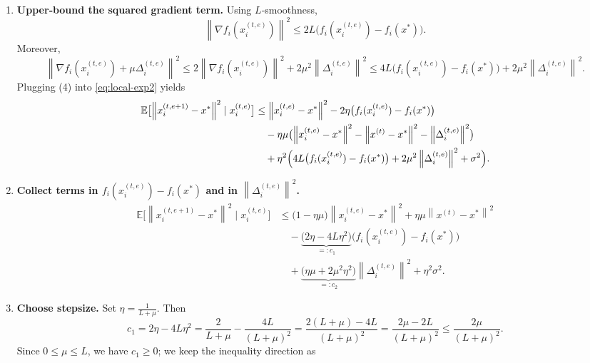 \documentclass{article}
\newcommand{\E}{\mathbb{E}}
\newcommand{\norm}[1]{\left\lVert#1\right\rVert}
\begin{document}
\begin{enumerate}
\begin{align}
&\quad -\eta\mu\Bigl(\norm{x_{i}^{(t,e)}-x^{*}}^{2}
-\norm{x^{(t)}-x^{*}}^{2}
-\norm{\Delta_{i}^{(t,e)}}^{2}\Bigr) \nonumber\\
&\quad+\eta^{2}\Bigl(\norm{\nabla f_i(x_{i}^{(t,e)})+\mu\Delta_{i}^{(t,e)}}^{2}+\sigma^{2}\Bigr).
\label{eq:local-exp2}
\end{align}
\item[Step 4.] \textbf{Upper‑bound the squared gradient term.}  
Using $L$‑smoothness,
\[
\norm{\nabla f_i(x_{i}^{(t,e)})}^{2}\le 2L\bigl(f_i(x_{i}^{(t,e)})-f_i(x^{*})\bigr).
\]
Moreover,
\[
\norm{\nabla f_i(x_{i}^{(t,e)})+\mu\Delta_{i}^{(t,e)}}^{2}
\le 2\norm{\nabla f_i(x_{i}^{(t,e)})}^{2}+2\mu^{2}\norm{\Delta_{i}^{(t,e)}}^{2}
\le 4L\bigl(f_i(x_{i}^{(t,e)})-f_i(x^{*})\bigr)+2\mu^{2}\norm{\Delta_{i}^{(t,e)}}^{2}.
\tag{4}
\]
Plugging (4) into \eqref{eq:local-exp2} yields
\begin{align}
\E\bigl[\norm{x_{i}^{(t,e+1)}-x^{*}}^{2}\mid x_{i}^{(t,e)}\bigr]
&\le \norm{x_{i}^{(t,e)}-x^{*}}^{2}
-2\eta\bigl(f_i(x_{i}^{(t,e)})-f_i(x^{*})\bigr) \nonumber\\
&\quad -\eta\mu\bigl(\norm{x_{i}^{(t,e)}-x^{*}}^{2}
-\norm{x^{(t)}-x^{*}}^{2}
-\norm{\Delta_{i}^{(t,e)}}^{2}\bigr) \nonumber\\
&\quad +\eta^{2}\Bigl(4L\bigl(f_i(x_{i}^{(t,e)})-f_i(x^{*})\bigr)+2\mu^{2}\norm{\Delta_{i}^{(t,e)}}^{2}+\sigma^{2}\Bigr).
\label{eq:local-exp3}
\end{align}
\item[Step 5.] \textbf{Collect terms in $f_i(x_{i}^{(t,e)})-f_i(x^{*})$ and in $\norm{\Delta_{i}^{(t,e)}}^{2}$.}
\begin{align}
\E\bigl[\norm{x_{i}^{(t,e+1)}-x^{*}}^{2}\mid x_{i}^{(t,e)}\bigr]
&\le \bigl(1-\eta\mu\bigr)\norm{x_{i}^{(t,e)}-x^{*}}^{2}
+\eta\mu\norm{x^{(t)}-x^{*}}^{2} \nonumber\\
&\quad -\underbrace{\bigl(2\eta-4L\eta^{2}\bigr)}_{=:c_{1}}
\bigl(f_i(x_{i}^{(t,e)})-f_i(x^{*})\bigr) \nonumber\\
&\quad +\underbrace{\bigl(\eta\mu+\!2\mu^{2}\eta^{2}\bigr)}_{=:c_{2}}
\norm{\Delta_{i}^{(t,e)}}^{2}
+\eta^{2}\sigma^{2}.
\label{eq:local-coll}
\end{align}
\item[Step 6.] \textbf{Choose stepsize.}  
Set $\displaystyle\eta=\frac{1}{L+\mu}$. Then
\[
c_{1}=2\eta-4L\eta^{2}
= \frac{2}{L+\mu}-\frac{4L}{(L+\mu)^{2}}
= \frac{2(L+\mu)-4L}{(L+\mu)^{2}}
= \frac{2\mu-2L}{(L+\mu)^{2}}\le\frac{2\mu}{(L+\mu)^{2}}.
\]
Since $0\le\mu\le L$, we have $c_{1}\ge 0$; we keep the inequality direction as

\end{enumerate}
\end{document}
